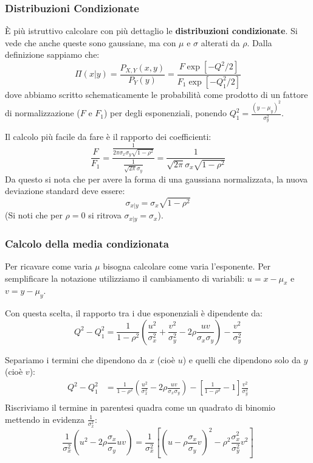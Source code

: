 \documentclass[openany,a4paper,12pt]{book}
\theoremstyle{remark}
\begin{document}
\subsubsection*{Distribuzioni Condizionate}
È più istruttivo calcolare con più dettaglio le \textbf{distribuzioni condizionate}. Si vede che anche queste sono gaussiane, ma con $\mu$ e $\sigma$ alterati da $\rho$.
Dalla definizione sappiamo che:
\begin{equation}
\Pi(x|y) = \frac{P_{X,Y}(x,y)}{P_Y(y)} = \frac{F \exp[-Q^2/2]}{F_1 \exp[-Q_1^2/2]}
\end{equation}
dove abbiamo scritto schematicamente le probabilità come prodotto di un fattore di normalizzazione ($F$ e $F_1$) per degli esponenziali, ponendo $Q_1^2 = \frac{(y-\mu_y)^2}{\sigma_y^2}$.

Il calcolo più facile da fare è il rapporto dei coefficienti:
\begin{equation}
\frac{F}{F_1} = \frac{\frac{1}{2\pi\sigma_x\sigma_y\sqrt{1-\rho^2}}}{\frac{1}{\sqrt{2\pi}\sigma_y}} = \frac{1}{\sqrt{2\pi}\sigma_x\sqrt{1-\rho^2}}
\end{equation}
Da questo si nota che per avere la forma di una gaussiana normalizzata, la nuova deviazione standard deve essere:
\begin{equation}
\sigma_{x|y} = \sigma_x \sqrt{1-\rho^2}
\end{equation}
(Si noti che per $\rho = 0$ si ritrova $\sigma_{x|y} = \sigma_x$).

\subsubsection*{Calcolo della media condizionata}
Per ricavare come varia $\mu$ bisogna calcolare come varia l'esponente. Per semplificare la notazione utilizziamo il cambiamento di variabili:
$u = x - \mu_x$ e $v = y - \mu_y$.

Con questa scelta, il rapporto tra i due esponenziali è dipendente da:
\begin{equation*}
Q^2 - Q_1^2 = \frac{1}{1-\rho^2} \left( \frac{u^2}{\sigma_x^2} + \frac{v^2}{\sigma_y^2} - 2\rho\frac{uv}{\sigma_x\sigma_y} \right) - \frac{v^2}{\sigma_y^2}
\end{equation*}

Separiamo i termini che dipendono da $x$ (cioè $u$) e quelli che dipendono solo da $y$ (cioè $v$):
\begin{align*}
Q^2 - Q_1^2 &= \frac{1}{1-\rho^2} \left( \frac{u^2}{\sigma_x^2} - 2\rho\frac{uv}{\sigma_x\sigma_y} \right) - \left[ \frac{1}{1-\rho^2} - 1 \right] \frac{v^2}{\sigma_y^2} \\
\end{align*}
Riscriviamo il termine in parentesi quadra come un quadrato di binomio mettendo in evidenza $\frac{1}{\sigma_x^2}$:
\begin{equation*}
\frac{1}{\sigma_x^2} (u^2 - 2\rho\frac{\sigma_x}{\sigma_y}uv) = \frac{1}{\sigma_x^2} \left[ \left(u - \rho\frac{\sigma_x}{\sigma_y}v\right)^2 - \rho^2\frac{\sigma_x^2}{\sigma_y^2}v^2 \right]
\end{equation*}
\end{document}

